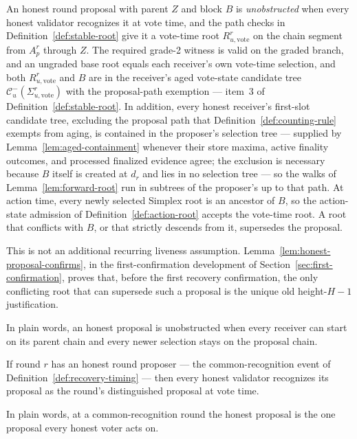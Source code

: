 \begin{definition}\label{def:usable-honest-round}
An honest round proposal with parent \(Z\) and block \(B\) is
\emph{unobstructed} when every honest validator recognizes it at vote time,
and the path checks in Definition~\ref{def:stable-root} give it a vote-time
root \(R_{u,\mathrm{vote}}^r\) on the chain segment from \(A_p^r\) through
\(Z\).  The required grade-2 witness is valid on the graded branch, and an
ungraded base root equals each receiver's own vote-time selection, and
both \(R_{u,\mathrm{vote}}^r\) and \(B\) are in the receiver's aged
vote-state candidate tree
\(\mathcal C^{-}_u(\Sigma_{u,\mathrm{vote}}^r)\) with the
proposal-path exemption --- item~3 of Definition~\ref{def:stable-root}.  In addition, every honest receiver's first-slot
candidate tree, excluding the proposal path that
Definition~\ref{def:counting-rule} exempts from aging, is contained
in the proposer's selection tree --- supplied by
Lemma~\ref{lem:aged-containment} whenever their store maxima, active
finality outcomes, and processed
finalized evidence agree; the exclusion is necessary
because \(B\) itself is created at \(d_r\) and lies in no selection
tree --- so the walks of
Lemma~\ref{lem:forward-root} run in subtrees of the proposer's up to
that path.  At action time, every newly selected Simplex root is an
ancestor of \(B\), so the action-state admission of
Definition~\ref{def:action-root} accepts the vote-time root.  A root that conflicts with \(B\),
or that strictly descends from it, supersedes the proposal.

This is not an additional recurring liveness assumption.
Lemma~\ref{lem:honest-proposal-confirms}, in the first-confirmation
development of Section~\ref{sec:first-confirmation}, proves that, before the first recovery
confirmation, the only conflicting root that can supersede such a proposal
is the unique old height-\(H-1\) justification.

In plain words, an honest proposal is unobstructed when every receiver can
start on its parent chain and every newer selection stays on the proposal
chain.
\end{definition}

\begin{lemma}
\label{lem:common-recognition}
If round \(r\) has an honest round proposer --- the common-recognition
event of Definition~\ref{def:recovery-timing} --- then every honest
validator recognizes its proposal as the round's distinguished proposal
at vote time.

In plain words, at a common-recognition round the honest proposal is the
one proposal every honest voter acts on.
\end{lemma}

